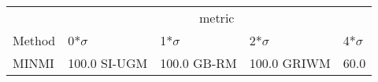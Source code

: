 
\begin{tabular}{lllll}
\toprule
\multicolumn{1}{c}{ } & \multicolumn{4}{c}{metric} \\
\cmidrule(l{3pt}r{3pt}){2-5}
Method & 0*$\sigma$ & 1*$\sigma$ & 2*$\sigma$ & 4*$\sigma$\\
\midrule
MINMI & 100.0%
SI-UGM & 100.0%
GB-RM & 100.0%
GRIWM & 60.0%
\bottomrule
\end{tabular}
